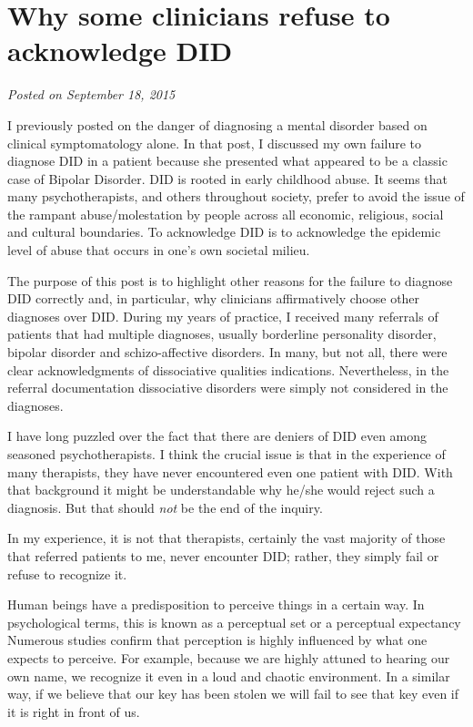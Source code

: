 \documentclass[]{book}
\begin{document}
\hypertarget{why-some-clinicians-refuse-to-acknowledge-did}{%
\section{Why some clinicians refuse to acknowledge DID}\label{why-some-clinicians-refuse-to-acknowledge-did}}

\emph{Posted on September 18, 2015}

I previously posted on the danger of diagnosing a mental disorder based on clinical symptomatology alone. In that post, I discussed my own failure to diagnose DID in a patient because she presented what appeared to be a classic case of Bipolar Disorder. DID is rooted in early childhood abuse. It seems that many psychotherapists, and others throughout society, prefer to avoid the issue of the rampant abuse/molestation by people across all economic, religious, social and cultural boundaries. To acknowledge DID is to acknowledge the epidemic level of abuse that occurs in one's own societal milieu.

The purpose of this post is to highlight other reasons for the failure to diagnose DID correctly and, in particular, why clinicians affirmatively choose other diagnoses over DID. During my years of practice, I received many referrals of patients that had multiple diagnoses, usually borderline personality disorder, bipolar disorder and schizo-affective disorders. In many, but not all, there were clear acknowledgments of dissociative qualities indications. Nevertheless, in the referral documentation dissociative disorders were simply not considered in the diagnoses.

I have long puzzled over the fact that there are deniers of DID even among seasoned psychotherapists. I think the crucial issue is that in the experience of many therapists, they have never encountered even one patient with DID. With that background it might be understandable why he/she would reject such a diagnosis. But that should \emph{not} be the end of the inquiry.

In my experience, it is not that therapists, certainly the vast majority of those that referred patients to me, never encounter DID; rather, they simply fail or refuse to recognize it.

Human beings have a predisposition to perceive things in a certain way. In psychological terms, this is known as a perceptual set or a perceptual expectancy Numerous studies confirm that perception is highly influenced by what one expects to perceive. For example, because we are highly attuned to hearing our own name, we recognize it even in a loud and chaotic environment. In a similar way, if we believe that our key has been stolen we will fail to see that key even if it is right in front of us.
\end{document}
